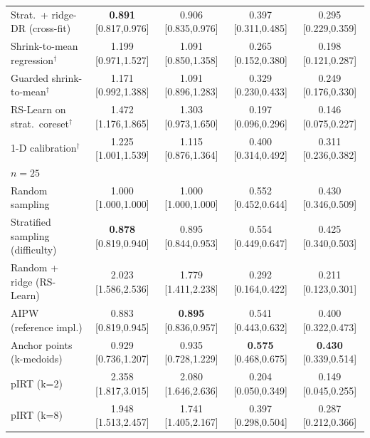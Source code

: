 \begin{tabular}{l cccc}
Strat.\ + ridge-DR (cross-fit) & \textbf{0.891} {\scriptsize[0.817,0.976]} & 0.906 {\scriptsize[0.835,0.976]} & 0.397 {\scriptsize[0.311,0.485]} & 0.295 {\scriptsize[0.229,0.359]} \\
Shrink-to-mean regression$^\dagger$ & 1.199 {\scriptsize[0.971,1.527]} & 1.091 {\scriptsize[0.850,1.358]} & 0.265 {\scriptsize[0.152,0.380]} & 0.198 {\scriptsize[0.121,0.287]} \\
Guarded shrink-to-mean$^\dagger$ & 1.171 {\scriptsize[0.992,1.388]} & 1.091 {\scriptsize[0.896,1.283]} & 0.329 {\scriptsize[0.230,0.433]} & 0.249 {\scriptsize[0.176,0.330]} \\
RS-Learn on strat.\ coreset$^\dagger$ & 1.472 {\scriptsize[1.176,1.865]} & 1.303 {\scriptsize[0.973,1.650]} & 0.197 {\scriptsize[0.096,0.296]} & 0.146 {\scriptsize[0.075,0.227]} \\
1-D calibration$^\dagger$ & 1.225 {\scriptsize[1.001,1.539]} & 1.115 {\scriptsize[0.876,1.364]} & 0.400 {\scriptsize[0.314,0.492]} & 0.311 {\scriptsize[0.236,0.382]} \\
\midrule
\multicolumn{5}{l}{\emph{$n=25$}}\\
Random sampling & 1.000 {\scriptsize[1.000,1.000]} & 1.000 {\scriptsize[1.000,1.000]} & 0.552 {\scriptsize[0.452,0.644]} & 0.430 {\scriptsize[0.346,0.509]} \\
Stratified sampling (difficulty) & \textbf{0.878} {\scriptsize[0.819,0.940]} & 0.895 {\scriptsize[0.844,0.953]} & 0.554 {\scriptsize[0.449,0.647]} & 0.425 {\scriptsize[0.340,0.503]} \\
Random + ridge (RS-Learn) & 2.023 {\scriptsize[1.586,2.536]} & 1.779 {\scriptsize[1.411,2.238]} & 0.292 {\scriptsize[0.164,0.422]} & 0.211 {\scriptsize[0.123,0.301]} \\
AIPW (reference impl.) & 0.883 {\scriptsize[0.819,0.945]} & \textbf{0.895} {\scriptsize[0.836,0.957]} & 0.541 {\scriptsize[0.443,0.632]} & 0.400 {\scriptsize[0.322,0.473]} \\
Anchor points (k-medoids) & 0.929 {\scriptsize[0.736,1.207]} & 0.935 {\scriptsize[0.728,1.229]} & \textbf{0.575} {\scriptsize[0.468,0.675]} & \textbf{0.430} {\scriptsize[0.339,0.514]} \\
pIRT (k=2) & 2.358 {\scriptsize[1.817,3.015]} & 2.080 {\scriptsize[1.646,2.636]} & 0.204 {\scriptsize[0.050,0.349]} & 0.149 {\scriptsize[0.045,0.255]} \\
pIRT (k=8) & 1.948 {\scriptsize[1.513,2.457]} & 1.741 {\scriptsize[1.405,2.167]} & 0.397 {\scriptsize[0.298,0.504]} & 0.287 {\scriptsize[0.212,0.366]} \\

\end{tabular}
